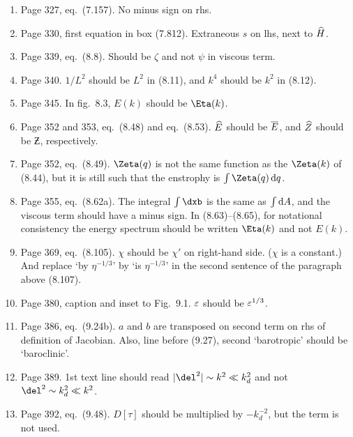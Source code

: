\documentclass[10pt]{article}
\newcommand{\eq}{eq.\ } \newcommand{\Eq}{Eq.\ }
\begin{document}
\begin{enumerate}
\item Page 327, \eq (7.157). No minus sign on rhs.

\item Page 330, first equation in box (7.812). Extraneous $s$ on lhs, next to $\widehat H$.

\item Page 339, \eq (8.8). Should be $\zeta$ and not $\psi$ in viscous term.


\item Page 340. $1/L^2$ should be $L^2$ in (8.11), and $k^4$ should be $k^2$ in (8.12).

\item Page 345. In fig.\ 8.3, $E(k)$ should be $\Eta(k)$.

\item Page 352 and 353, \eq (8.48) and \eq (8.53). $\widehat E$ should be $\overline E$, and $\widehat Z$ should be $\Zbar$, respectively.

\item Page 352, \eq (8.49).  $\Zeta(q)$ is not the same function as the $\Zeta(k)$ of (8.44), but it is still such that the enstrophy is $\int \Zeta(q) \, \d q$.

\item Page 355, \eq (8.62a). The integral $\int \dxb$ is the same as $\int \mathrm{d} A$, and the viscous term should have a minus sign. In (8.63)--(8.65), for notational consistency the energy spectrum should be written $\Eta(k)$ and not $E(k)$.

\item Page 369, \eq (8.105). $\chi$ should be $\chi'$ on right-hand side. ($\chi$ is a constant.) And replace `by $\eta^{-1/3}$' by `is $\eta^{-1/3}$' in
the second sentence of the paragraph above (8.107).

\item Page 380, caption and inset to Fig.\ 9.1. $\varepsilon$ should be $\varepsilon^{1/3}$.

\item Page 386, \eq (9.24b). $a$ and $b$ are transposed on second term on rhs of definition of Jacobian. Also, line before (9.27), second `barotropic' should be `baroclinic'.

\item Page 389. 1st text line should read $|\del^2| \sim
k^2 \ll \kd^2$ and not $\del^2 \sim
\kd^2 \ll k^2$.

\item Page 392, \eq (9.48). $D[\tau]$ should be multiplied by $-k_d^{-2}$, but the term is not used.


\end{enumerate}
\end{document}
